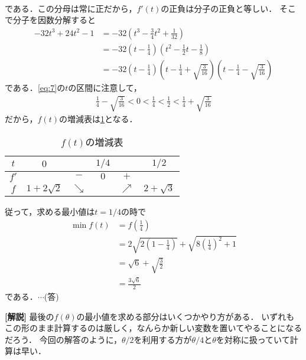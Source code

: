\documentclass[a4paper,10pt]{ltjsarticle}
\begin{document}
\begin{multicols}{2}
\begin{align*}
  \end{align*}
  である．この分母は常に正だから，$f'(t)$の正負は分子の正負と等しい．
  そこで分子を因数分解すると
  \begin{align*}
    -32t^3 + 24t^2-1
     & = -32\left(t^3-\frac{3}{4}t^2+\frac{1}{32}\right)                                                                           \\
     & = -32\left(t-\frac{1}{4}\right)\left(t^2-\frac{1}{2}t-\frac{1}{8}\right)                                                    \\
     & = -32\left(t-\frac{1}{4}\right)\left(t-\frac{1}{4}+\sqrt{\frac{3}{16}}\right)\left(t-\frac{1}{4}-\sqrt{\frac{3}{16}}\right)
  \end{align*}
  である．\cref{eq:7}の$t$の区間に注意して，
  \begin{align*}
    \frac{1}{4}-\sqrt{\frac{3}{16}} < 0 < \frac{1}{4} < \frac{1}{2} < \frac{1}{4}+\sqrt{\frac{3}{16}}
  \end{align*}
  だから，$f(t)$の増減表は\cref{table:1}となる．

  \begin{table}[H]
    \centering
    \caption{$f(t)$の増減表}
    \label{table:1}
    \begin{tabular}{|c||c|c|c|c|c|}
      \hline
      $t$  & $0$           &            & $1/4$ &            & $1/2$        \\
      \hline
      $f'$ &               & $-$        & $0$   & $+$        &              \\
      \hline
      $f$  & $1+2\sqrt{2}$ & $\searrow$ &       & $\nearrow$ & $2+\sqrt{3}$ \\
      \hline
    \end{tabular}
  \end{table}

  従って，求める最小値は$t=1/4$の時で
  \begin{align*}
    \min f(t)
     & = f\left(\frac{1}{4}\right)                                                  \\
     & = 2\sqrt{2\left(1-\frac{1}{4}\right)} + \sqrt{8\left(\frac{1}{4}\right)^2+1} \\
     & = \sqrt{6} + \sqrt{\frac{3}{2}}                                              \\
     & = \frac{3\sqrt{6}}{2}
  \end{align*}
  である．$\cdots$(答)


  \vspace{10pt}
  {\bf[解説]}
  最後の$f(\theta)$の最小値を求める部分はいくつかやり方がある．
  いずれもこの形のまま計算するのは厳しく，なんらか新しい変数を置いてやることになるだろう．
  今回の解答のように，$\theta/2$を利用する方が$\theta/4$と$\theta$を対称に扱っていて計算は早い．


\end{multicols}
\end{document}
